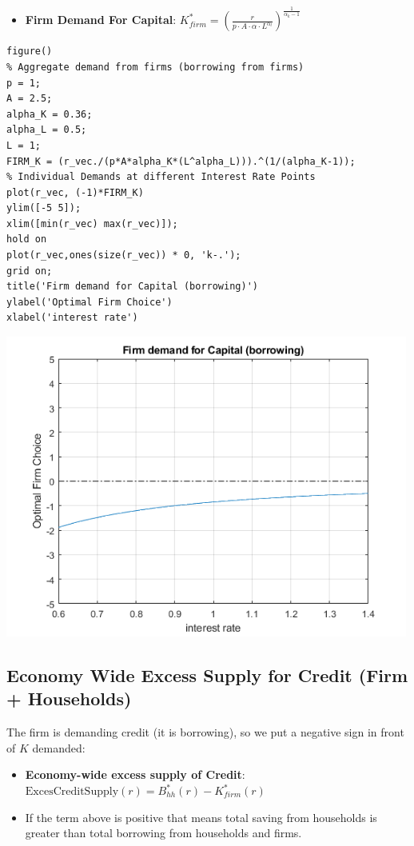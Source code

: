 \documentclass[
]{book}
\providecommand{\tightlist}{%
  \setlength{\itemsep}{0pt}\setlength{\parskip}{0pt}}
\begin{document}
\begin{itemize}
\tightlist
\item
  \textbf{Firm Demand For Capital}:
  \(K_{firm}^* ={\left(\frac{r}{p\cdot A\cdot \alpha \cdot L^{\alpha_l } }\right)}^{\frac{1}{\alpha_k -1}}\)
\end{itemize}

\begin{verbatim}
figure()
% Aggregate demand from firms (borrowing from firms)
p = 1;
A = 2.5;
alpha_K = 0.36;
alpha_L = 0.5;
L = 1;
FIRM_K = (r_vec./(p*A*alpha_K*(L^alpha_L))).^(1/(alpha_K-1));
% Individual Demands at different Interest Rate Points
plot(r_vec, (-1)*FIRM_K)
ylim([-5 5]);
xlim([min(r_vec) max(r_vec)]);
hold on
plot(r_vec,ones(size(r_vec)) * 0, 'k-.');
grid on;
title('Firm demand for Capital (borrowing)')
ylabel('Optimal Firm Choice')
xlabel('interest rate')
\end{verbatim}

\includegraphics[width=5.20833in,height=\textheight]{img/equilibrium_constrainedborrow_images/figure_2.png}

\hypertarget{economy-wide-excess-supply-for-credit-firm-households}{%
\subsection{Economy Wide Excess Supply for Credit (Firm + Households)}\label{economy-wide-excess-supply-for-credit-firm-households}}

The firm is demanding credit (it is borrowing), so we put a negative
sign in front of \(K\) demanded:

\begin{itemize}
\item
  \textbf{Economy-wide excess supply of Credit}:
  \(\textrm{ExcesCreditSupply}(r)=B_{hh}^* (r)-K_{firm}^* (r)\)
\item
  If the term above is positive that means total saving from
  households is greater than total borrowing from households and
  firms.
\end{itemize}
\end{document}
